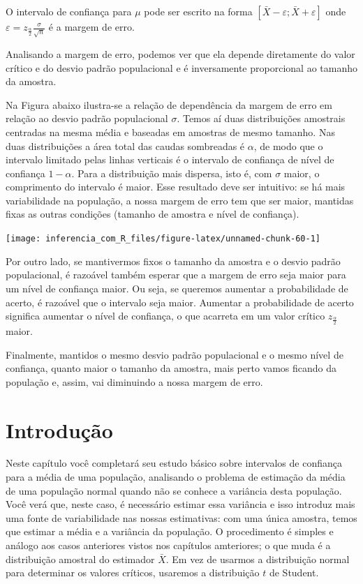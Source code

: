 \documentclass[
]{book}
\begin{document}
O intervalo de confiança para \(\mu\) pode ser escrito na forma \(\left[\bar X - \varepsilon;\bar X + \varepsilon \right]\) onde \(\varepsilon=z_{\frac{\alpha}{2}}\frac{\sigma}{\sqrt{n}}\) é a margem de erro.

Analisando a margem de erro, podemos ver que ela depende diretamente do valor crítico e do desvio padrão populacional e é inversamente proporcional ao tamanho da amostra.

Na Figura abaixo ilustra-se a relação de dependência da margem de erro em relação ao desvio padrão populacional \(\sigma\). Temos aí duas distribuições amostrais centradas na mesma média e baseadas em amostras de mesmo tamanho. Nas duas distribuições a área total das caudas sombreadas é \(\alpha\), de modo que o intervalo limitado pelas linhas verticais é o intervalo de confiança de nível de confiança \(1-\alpha\). Para a distribuição mais dispersa, isto é, com \(\sigma\) maior, o comprimento do intervalo é maior. Esse resultado deve ser intuitivo: se há mais variabilidade na população, a nossa margem de erro tem que ser maior, mantidas fixas as outras condições (tamanho de amostra e nível de confiança).

\begin{center}\texttt{[image: inferencia\_com\_R\_files/figure-latex/unnamed-chunk-60-1]} \end{center}

Por outro lado, se mantivermos fixos o tamanho da amostra e o desvio padrão populacional, é razoável também esperar que a margem de erro seja maior para um nível de confiança maior. Ou seja, se queremos aumentar a probabilidade de acerto, é razoável que o intervalo seja maior. Aumentar a probabilidade de acerto significa aumentar o nível de confiança, o que acarreta em um valor crítico \(z_{\frac{\alpha}{2}}\) maior.

Finalmente, mantidos o mesmo desvio padrão populacional e o mesmo nível de confiança, quanto maior o tamanho da amostra, mais perto vamos ficando da população e, assim, vai diminuindo a nossa margem de erro.

\hypertarget{introduuxe7uxe3o-5}{%
\section{Introdução}\label{introduuxe7uxe3o-5}}

Neste capítulo você completará seu estudo básico sobre intervalos de confiança para a média de uma população, analisando o problema de estimação da média de uma população normal quando não se conhece a variância desta população. Você verá que, neste caso, é necessário estimar essa variância e isso introduz mais uma fonte de variabilidade nas nossas estimativas: com uma única amostra, temos que estimar a média e a variância da população. O procedimento é simples e análogo aos casos anteriores vistos nos capítulos amteriores; o que muda é a distribuição amostral do estimador \(\bar X\). Em vez de usarmos a distribuição normal para determinar os valores críticos, usaremos a distribuição \(t\) de Student.
\end{document}
